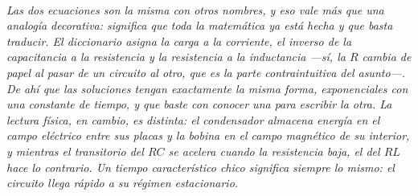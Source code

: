 \begin{center}
\\[0.5em]
{\small\itshape Las dos ecuaciones son la misma con otros nombres, y eso vale
más que una analogía decorativa: significa que toda la matemática ya está hecha
y que basta traducir. El diccionario asigna la carga a la corriente, el inverso
de la capacitancia a la resistencia y la resistencia a la inductancia ---sí, la
$R$ cambia de papel al pasar de un circuito al otro, que es la parte
contraintuitiva del asunto---. De ahí que las soluciones tengan exactamente la
misma forma, exponenciales con una constante de tiempo, y que baste con conocer
una para escribir la otra. La lectura física, en cambio, es distinta: el
condensador almacena energía en el campo \emph{eléctrico} entre sus placas y la
bobina en el campo \emph{magnético} de su interior, y mientras el transitorio
del $RC$ se acelera cuando la resistencia baja, el del $RL$ hace lo contrario.
Un tiempo característico chico significa siempre lo mismo: el circuito llega
rápido a su régimen estacionario.}
\end{center}
